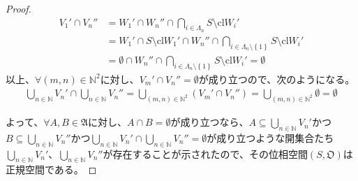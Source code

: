 \documentclass[dvipdfmx]{jsarticle}
\begin{document}
\begin{proof}
\begin{align*}
V_{1}' \cap V_{n}'' &= W_{1}' \cap W_{n}'' \cap \bigcap_{i \in \varLambda_{n}} {S \setminus {\mathrm{cl}}W_{i}'}\\
&= W_{1}' \cap S \setminus {\mathrm{cl}}W_{1}' \cap W_{n}'' \cap \bigcap_{i \in \varLambda_{n} \setminus \left\{ 1 \right\}} {S \setminus {\mathrm{cl}}W_{i}'}\\
&= \emptyset \cap W_{n}'' \cap \bigcap_{i \in \varLambda_{n} \setminus \left\{ 1 \right\}} {S \setminus {\mathrm{cl}}W_{i}'} = \emptyset
\end{align*}
以上、$\forall(m,n) \in \mathbb{N}^{2}$に対し、$V_{m}' \cap V_{n}'' = \emptyset$が成り立つので、次のようになる。
\begin{align*}
\bigcup_{n \in \mathbb{N}} V_{n}' \cap \bigcup_{n \in \mathbb{N}} V_{n}'' = \bigcup_{(m,n) \in \mathbb{N}^{2}} \left( V_{m}' \cap V_{n}'' \right) = \bigcup_{(m,n) \in \mathbb{N}^{2}} \emptyset = \emptyset
\end{align*}\par
よって、$\forall A,B \in \mathfrak{A}$に対し、$A \cap B = \emptyset$が成り立つなら、$A \subseteq \bigcup_{n \in \mathbb{N}} V_{n}'$かつ$B \subseteq \bigcup_{n \in \mathbb{N}} V_{n}''$かつ$\bigcup_{n \in \mathbb{N}} V_{n}' \cap \bigcup_{n \in \mathbb{N}} V_{n}'' = \emptyset$が成り立つような開集合たち$\bigcup_{n \in \mathbb{N}} V_{n}'$、$\bigcup_{n \in \mathbb{N}} V_{n}''$が存在することが示されたので、その位相空間$\left( S,\mathfrak{O} \right)$は正規空間である。
\end{proof}
\end{document}
